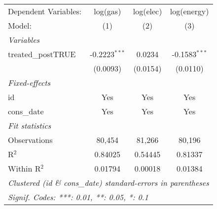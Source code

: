
\begin{tabular}{lccc}
   \tabularnewline\midrule\midrule
   Dependent Variables: & log(gas)        & log(elec) & log(energy)\\
   Model:               & (1)             & (2)       & (3)\\
   \midrule \emph{Variables} &   &   &  \\
   treated\_postTRUE   & -0.2223$^{***}$ & 0.0234    & -0.1583$^{***}$\\
                        & (0.0093)        & (0.0154)  & (0.0110)\\
   \midrule \emph{Fixed-effects} &   &   &  \\
   id                   & Yes             & Yes       & Yes\\
   cons\_date          & Yes             & Yes       & Yes\\
   \midrule \emph{Fit statistics} &   &   &  \\
   Observations         & 80,454          & 81,266    & 80,196\\
   R$^2$                & 0.84025         & 0.54445   & 0.81337\\
   Within R$^2$         & 0.01794         & 0.00018   & 0.01384\\
   \midrule\midrule\multicolumn{4}{l}{\emph{Clustered (id \& cons\_date) standard-errors in parentheses}}\\
   \multicolumn{4}{l}{\emph{Signif. Codes: ***: 0.01, **: 0.05, *: 0.1}}\\
\end{tabular}



